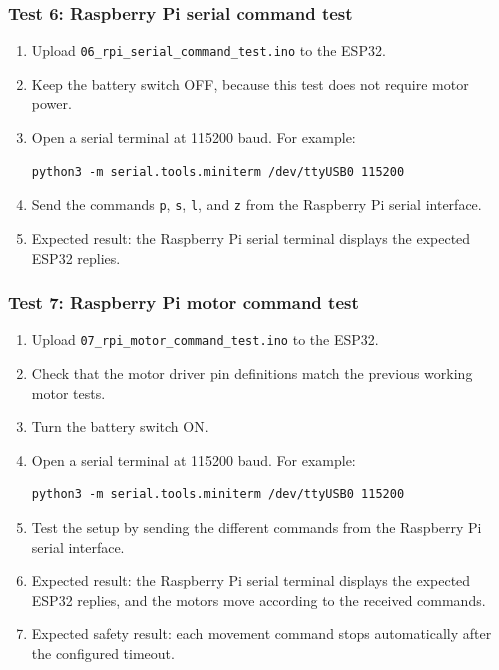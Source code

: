 \documentclass[12pt]{article}
\begin{document}
\subsubsection{Test 6: Raspberry Pi serial command test}
\begin{enumerate}
    \item Upload \texttt{06\_rpi\_serial\_command\_test.ino} to the ESP32.
    \item Keep the battery switch OFF, because this test does not require motor power.
    \item Open a serial terminal at 115200 baud. For example:
    \begin{verbatim}
python3 -m serial.tools.miniterm /dev/ttyUSB0 115200
    \end{verbatim}
    \item Send the commands \texttt{p}, \texttt{s}, \texttt{l}, and \texttt{z} from the Raspberry Pi serial interface.
    \item Expected result: the Raspberry Pi serial terminal displays the expected ESP32 replies.
\end{enumerate}

\subsubsection{Test 7: Raspberry Pi motor command test}
\begin{enumerate}
    \item Upload \texttt{07\_rpi\_motor\_command\_test.ino} to the ESP32.
    \item Check that the motor driver pin definitions match the previous working motor tests.
    \item Turn the battery switch ON.
    \item Open a serial terminal at 115200 baud. For example:
    \begin{verbatim}
python3 -m serial.tools.miniterm /dev/ttyUSB0 115200
    \end{verbatim}
    \item Test the setup by sending the different commands from the Raspberry Pi serial interface.
    \item Expected result: the Raspberry Pi serial terminal displays the expected ESP32 replies, and the motors move according to the received commands.
    \item Expected safety result: each movement command stops automatically after the configured timeout.
\end{enumerate}
\end{document}
